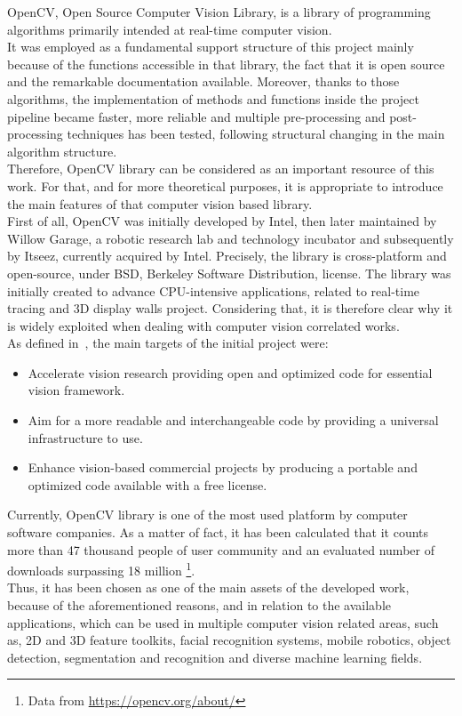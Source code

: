 OpenCV, Open Source Computer Vision Library, is a library of programming algorithms primarily intended at real-time computer vision.\\
It was employed as a fundamental support structure of this project mainly because of the functions accessible in that library, the fact that it is open source and the remarkable documentation available. 
Moreover, thanks to those algorithms, the implementation of methods and functions inside the project pipeline became faster, more reliable and multiple pre-processing and post-processing techniques has been tested, following structural changing in the main algorithm structure.\\
Therefore, OpenCV library can be considered as an important resource of this work.
For that, and for more theoretical purposes, it is appropriate to introduce the main features of that computer vision based library.\\
First of all, OpenCV was initially developed by Intel, then later maintained by Willow Garage, a robotic research lab and technology incubator and subsequently by Itseez, currently acquired by Intel.
Precisely, the library is cross-platform and open-source, under BSD, Berkeley Software Distribution, license. 
The library was initially created to advance CPU-intensive applications, related to real-time tracing and 3D display walls project.
Considering that, it is therefore clear why it is widely exploited when dealing with computer vision correlated works.\\
As defined in~\cite{bradski2008learning}, the main targets of the initial project were:
\begin{itemize}
	\item Accelerate vision research providing open and optimized code for essential vision framework.
	\item Aim for a more readable and interchangeable code by providing a universal infrastructure to use.
	\item Enhance vision-based commercial projects by producing a portable and optimized code available with a free license.
\end{itemize}
Currently, OpenCV library is one of the most used platform by computer software companies.
As a matter of fact, it has been calculated that it counts more than 47 thousand people of user community and an evaluated number of downloads surpassing 18 million \footnote{Data from \url{https://opencv.org/about/}}.\\
Thus, it has been chosen as one of the main assets of the developed work, because of the aforementioned reasons, and in relation to the available applications, which can be used in multiple computer vision related areas, such as, 2D and 3D feature toolkits, facial recognition systems, mobile robotics, object detection, segmentation and recognition and diverse machine learning fields.


